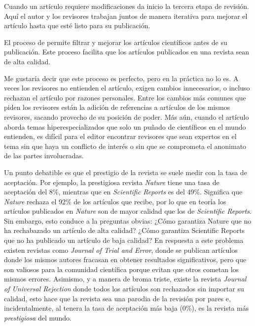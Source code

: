 Cuando un artículo requiere modificaciones da inicio la tercera etapa de
revisión.
Aquí el autor y los revisores trabajan juntos de manera iterativa para mejorar
el artículo hasta que esté listo para su publicación.

\begin{remember}
    El proceso de  permite filtrar y mejorar los
    artículos científicos antes de su publicación.
    Este proceso facilita que los artículos publicados en una revista sean de
    alta calidad.
\end{remember}

Me gustaría decir que este proceso es perfecto, pero en la práctica no lo es.
A veces los revisores no entienden el artículo, exigen cambios innecesarios, o
incluso rechazan el artículo por razones personales.
Entre los cambios más comunes que piden los revisores están la adición de
referencias a artículos de los mismos revisores, sacando provecho de su posición
de poder.
Más aún, cuando el artículo aborda temas hiperespecializados que solo un puñado
de científicos en el mundo entienden, es difícil para el editor encontrar
revisores que sean expertos en el tema sin que haya un conflicto de interés o
sin que se comprometa el anonimato de las partes involucradas.

Un punto debatible es que el prestigio de la revista se suele medir con la tasa
de aceptación.
Por ejemplo, la prestigiosa revista \emph{Nature} tiene una tasa de aceptación
del 8\%, mientras que en \emph{Scientific Reports} es del 49\%.
Significa que \emph{Nature} rechaza el 92\% de los artículos que recibe, por lo
que en teoría los artículos publicados en \emph{Nature} son de mayor calidad que
los de \emph{Scientific Reports}.
Sin embargo, esto conduce a la preguntas obvias:
¿Cómo garantiza Nature que no ha rechabazado un artículo de alta calidad?
¿Cómo garantiza Scientific Reports que no ha publicado un artículo de baja
calidad?
En respuesta a este problema existen revistas como \emph{Journal of Trial and
    Error}, donde se publican
artículos donde los mismos autores fracasan en obtener resultados
significativos, pero que son valiosos para la comunidad científica porque evitan
que otros cometan los mismos errores.
Asimismo, y a manera de broma triste, existe la revista \emph{Journal of
    Universal Rejection} donde todos
los artículos son rechazados sin importar su calidad, esto hace que la revista
sea una parodia de la revisión por pares e, incidentalmente, al tenera la tasa
de aceptación más baja (0\%), es la revista más \emph{prestigiosa} del mundo.

